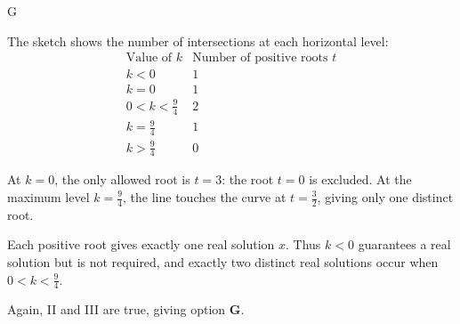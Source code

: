 \documentclass[11pt,a4paper]{article}
\begin{document}
\begin{enumerate}[label=\textbf{\arabic*.},leftmargin=*,itemsep=0pt,start=3]
\begin{djsSolution}{G}
\begin{djsSolutionFigure}
\end{djsSolutionFigure}

The sketch shows the number of intersections at each horizontal level:
\[
\begin{array}{c|c}
\text{Value of }k & \text{Number of positive roots }t\\[5pt]
\hline
k<0 & 1\\[5pt]
k=0 & 1\\[5pt]
0<k<\frac94 & 2\\[8pt]
k=\frac94 & 1\\[8pt]
k>\frac94 & 0
\end{array}
\]

At $k=0$, the only allowed root is $t=3$: the root $t=0$ is excluded. At the maximum level $k=\frac94$, the line touches the curve at $t=\frac32$, giving only one distinct root.

Each positive root gives exactly one real solution $x$. Thus $k<0$ guarantees a real solution but is not required, and exactly two distinct real solutions occur when $0<k<\frac94$.

Again, II and III are true, giving option \textbf{G}.
\end{djsSolution}
\end{enumerate}
\clearpage
\thispagestyle{djssolutions}
\vspace*{8pt}
\end{document}
